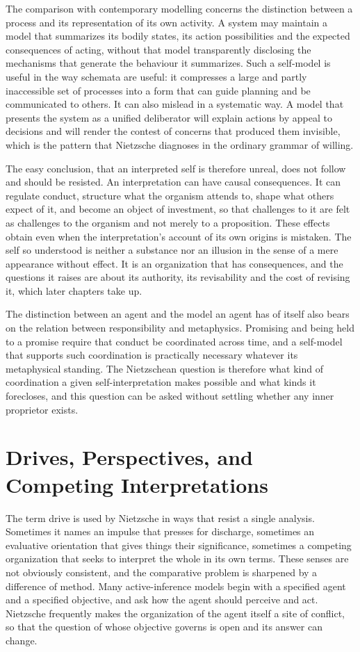 The comparison with contemporary modelling concerns the distinction between a process and its representation of its own activity. A system may maintain a model that summarizes its bodily states, its action possibilities and the expected consequences of acting, without that model transparently disclosing the mechanisms that generate the behaviour it summarizes. Such a self-model is useful in the way schemata are useful: it compresses a large and partly inaccessible set of processes into a form that can guide planning and be communicated to others. It can also mislead in a systematic way. A model that presents the system as a unified deliberator will explain actions by appeal to decisions and will render the contest of concerns that produced them invisible, which is the pattern that Nietzsche diagnoses in the ordinary grammar of willing.

The easy conclusion, that an interpreted self is therefore unreal, does not follow and should be resisted. An interpretation can have causal consequences. It can regulate conduct, structure what the organism attends to, shape what others expect of it, and become an object of investment, so that challenges to it are felt as challenges to the organism and not merely to a proposition. These effects obtain even when the interpretation's account of its own origins is mistaken. The self so understood is neither a substance nor an illusion in the sense of a mere appearance without effect. It is an organization that has consequences, and the questions it raises are about its authority, its revisability and the cost of revising it, which later chapters take up.

The distinction between an agent and the model an agent has of itself also bears on the relation between responsibility and metaphysics. Promising and being held to a promise require that conduct be coordinated across time, and a self-model that supports such coordination is practically necessary whatever its metaphysical standing. The Nietzschean question is therefore what kind of coordination a given self-interpretation makes possible and what kinds it forecloses, and this question can be asked without settling whether any inner proprietor exists.

\chapter{Drives, Perspectives, and Competing Interpretations}

The term drive is used by Nietzsche in ways that resist a single analysis. Sometimes it names an impulse that presses for discharge, sometimes an evaluative orientation that gives things their significance, sometimes a competing organization that seeks to interpret the whole in its own terms. These senses are not obviously consistent, and the comparative problem is sharpened by a difference of method. Many active-inference models begin with a specified agent and a specified objective, and ask how the agent should perceive and act. Nietzsche frequently makes the organization of the agent itself a site of conflict, so that the question of whose objective governs is open and its answer can change.

